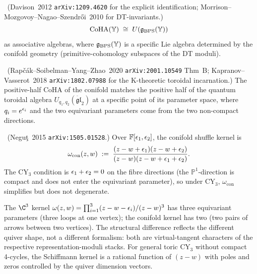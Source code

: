 \begin{theorem}
\label{w17:thm:conifold-coha}
\ClaimStatusProvedElsewhere\ (Davison~2012 \texttt{arXiv:1209.4620} for the
explicit identification; Morrison--Mozgovoy--Nagao--Szendr\H{o}i~2010 for
DT-invariants.)
\[
 \mathrm{CoHA}(\mathbb{Y}) \;\cong\; U(\mathfrak{g}_{\mathrm{BPS}}(\mathbb{Y}))
\]
as associative algebras, where $\mathfrak{g}_{\mathrm{BPS}}(\mathbb{Y})$ is a specific Lie algebra determined
by the conifold geometry (primitive-cohomology subspaces of the DT moduli).
\end{theorem}

\begin{theorem}
\label{w17:thm:rsyz-conifold}
\ClaimStatusProvedElsewhere\ (Rap\v c\'ak--Soibelman--Yang--Zhao~2020
\texttt{arXiv:2001.10549} Thm~B; Kapranov--Vasserot~2018
\texttt{arXiv:1802.07988} for the K-theoretic toroidal incarnation.)
The positive-half CoHA of the conifold matches the positive half of the
quantum toroidal algebra $U_{q_1, q_2}(\ddot{\mathfrak{gl}}_2)$ at a specific
point of its parameter space, where $q_i = e^{\epsilon_i}$ and the two equivariant
parameters come from the two non-compact directions.
\end{theorem}

\begin{definition}
\label{w17:def:conifold-shuffle-kernel}
\ClaimStatusDefinition\ (Negu\c t~2015 \texttt{arXiv:1505.01528}.)
Over $\mathbb{F}[\epsilon_1, \epsilon_2]$, the conifold shuffle kernel is
\[
 \omega_{\mathrm{con}}(z, w) \;:=\;
 \frac{(z - w + \epsilon_1)(z - w + \epsilon_2)}{(z - w)(z - w + \epsilon_1 + \epsilon_2)}.
\]
The CY$_3$ condition is $\epsilon_1 + \epsilon_2 = 0$ on the fibre directions (the
$\mathbb{P}^1$-direction is compact and does not enter the equivariant
parameter), so under CY$_3$, $\omega_{\mathrm{con}}$ simplifies but does not
degenerate.
\end{definition}

\begin{remark}
\label{w17:rem:kernel-difference}
The $\C^3$ kernel $\omega(z, w) = \prod_{i = 1}^{3}(z - w - \epsilon_i)/(z - w)^3$
has three equivariant parameters (three loops at one vertex); the conifold
kernel has two (two pairs of arrows between two vertices). The structural
difference reflects the different quiver shape, not a different formalism:
both are virtual-tangent characters of the respective representation-moduli
stacks. For general toric CY$_3$ without compact 4-cycles, the Schiffmann
kernel is a rational function of $(z - w)$ with poles and zeros controlled
by the quiver dimension vectors.
\end{remark}

